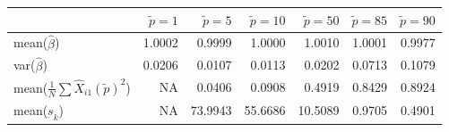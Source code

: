 
\begin{tabular}{lrrrrrr}
\toprule
  & $\tilde{p}=1$ & $\tilde{p}=5$ & $\tilde{p}=10$ & $\tilde{p}=50$ & $\tilde{p}=85$ & $\tilde{p}=90$\\
\midrule
mean($\hat{\beta}$) & 1.0002 & 0.9999 & 1.0000 & 1.0010 & 1.0001 & 0.9977\\
var($\hat{\beta}$) & 0.0206 & 0.0107 & 0.0113 & 0.0202 & 0.0713 & 0.1079\\
mean($\frac{1}{N}\sum \hat{X}_{i1}(\tilde{p})^2$) & NA & 0.0406 & 0.0908 & 0.4919 & 0.8429 & 0.8924\\
mean($\underbar{s}_k$) & NA & 73.9943 & 55.6686 & 10.5089 & 0.9705 & 0.4901\\
\bottomrule
\end{tabular}
